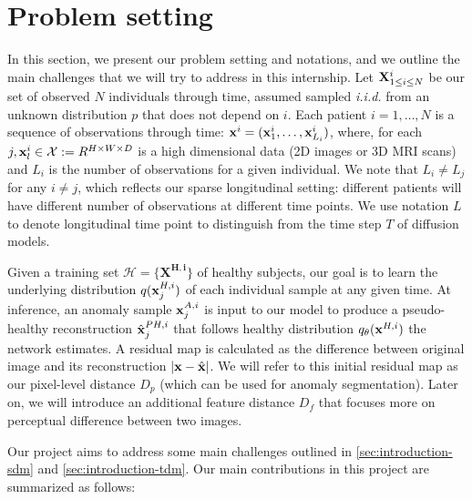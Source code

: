 \section{Problem setting}

In this section, we present our problem setting and notations, and we outline the main challenges that we will try to address in this internship. Let ${{\mathbf{X}}^i_{1 \leq i \leq N}}$ be our set of observed $N$ individuals through time, assumed sampled \textit{i.i.d.} from an unknown distribution $p$ that does not depend on $i$. Each patient $i = 1, \ldots , N$ is a sequence of observations through time: ${\mathbf{x}}^i = ({\mathbf{x}}^i_1, \dots, {\mathbf{x}}^i_{L_i})$, where, for each $j, {\mathbf{x}}^i_l \in \mathcal{X} := R^{H \times W \times D}$ is a high dimensional data (2D images or 3D MRI scans) and $L_i$ is the number of observations for a given individual. We note that $L_i \neq L_j$ for any $i \neq j$, which reflects our sparse longitudinal setting: different patients will have different number of observations at different time points. We use notation $L$ to denote longitudinal time point to distinguish from the time step $T$ of diffusion models. 

Given a training set $\mathbf{\mathcal{H} = \{X^{H,i}\}}$ of healthy subjects, our goal is to learn the underlying distribution $q({\mathbf{x}}^{H, i}_j)$ of each individual sample at any given time. At inference, an anomaly sample ${\mathbf{x}}^{A, i}_j$ is input to our model to produce a pseudo-healthy reconstruction $\hat{{\mathbf{x}}}^{PH, i}_j$ that follows healthy distribution $q_{\theta}({\mathbf{x}}^{H, i})$ the network estimates. A residual map is calculated as the difference between original image and its reconstruction $|{\mathbf{x}} - \hat{{\mathbf{x}}}|$. We will refer to this initial residual map as our pixel-level distance $D_p$ (which can be used for anomaly segmentation). Later on, we will introduce an additional feature distance $D_f$ that focuses more on perceptual difference between two images. 

Our project aims to address some main challenges outlined in \cref{sec:introduction-sdm} and \cref{sec:introduction-tdm}. Our main contributions in this project are summarized as follows: 

